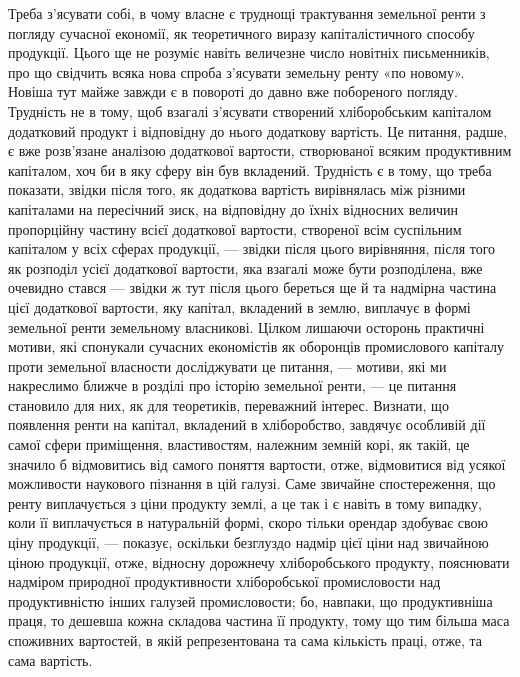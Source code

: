 Треба з’ясувати собі, в чому власне є труднощі трактування земельної
ренти з погляду сучасної економії, як теоретичного виразу капіталістичного
способу продукції. Цього ще не розуміє навіть величезне число новітніх письменників,
про що свідчить всяка нова спроба з’ясувати земельну ренту «по
новому». Новіша тут майже завжди є в повороті до давно вже побореного погляду.
Трудність не в тому, щоб взагалі з’ясувати створений хліборобським
капіталом додатковий продукт і відповідну до нього додаткову вартість. Це
питання, радше, є вже розв’язане аналізою додаткової вартости, створюваної
всяким продуктивним капіталом, хоч би в яку сферу він був вкладений. Трудність
є в тому, що треба показати, звідки після того, як додаткова вартість
вирівнялась між різними капіталами на пересічний зиск, на відповідну до
їхніх відносних величин пропорційну частину всієї додаткової вартости, створеної
всім суспільним капіталом у всіх сферах продукції, — звідки після цього вирівняння,
після того як розподіл усієї додаткової вартости, яка взагалі може
бути розподілена, вже очевидно стався — звідки ж тут після цього береться
ще й та надмірна частина цієї додаткової вартости, яку капітал, вкладений
в землю, виплачує в формі земельної ренти земельному власникові.
Цілком лишаючи осторонь практичні мотиви, які спонукали сучасних економістів
як оборонців промислового капіталу проти земельної власности
досліджувати це питання, — мотиви, які ми накреслимо ближче в розділі
про історію земельної ренти, — це питання становило для них, як для теоретиків,
переважний інтерес. Визнати, що появлення ренти на капітал, вкладений
в хліборобство, завдячує особливій дії самої сфери приміщення, властивостям,
належним земній корі, як такій, це значило б відмовитись від самого
поняття вартости, отже, відмовитися від усякої можливости наукового
пізнання в цій галузі. Саме звичайне спостереження, що ренту виплачується
з ціни продукту землі, а це так і є навіть в тому випадку, коли її виплачується
в натуральній формі, скоро тільки орендар здобуває свою ціну продукції,
— показує, оскільки безглуздо надмір цієї ціни над звичайною ціною
продукції, отже, відносну дорожнечу хліборобського продукту, пояснювати надміром
природної продуктивности хліборобської промисловости над продуктивністю
інших галузей промисловости; бо, навпаки, що продуктивніша праця, то
дешевша кожна складова частина її продукту, тому що тим більша маса споживних
вартостей, в якій репрезентована та сама кількість праці, отже, та сама вартість.

